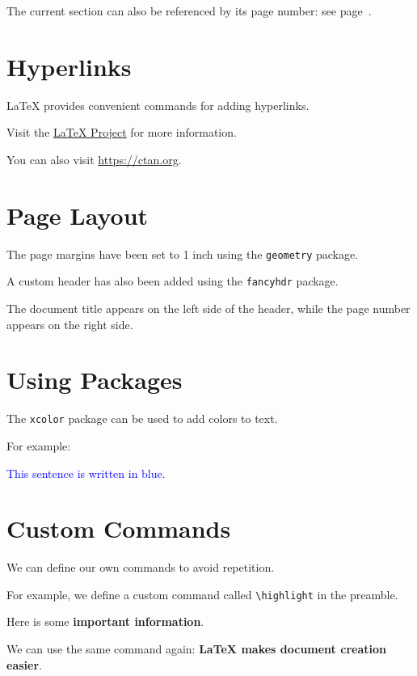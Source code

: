 \documentclass{article}
\newcommand{\highlight}[1]{\textbf{#1}}
\begin{document}
The current section can also be referenced by its page number:
see page~\pageref{sec:references}.


\section{Hyperlinks}

LaTeX provides convenient commands for adding hyperlinks.

Visit the
\href{https://www.latex-project.org}{LaTeX Project}
for more information.

You can also visit \url{https://ctan.org}.


\section{Page Layout}

The page margins have been set to 1 inch using the
\texttt{geometry} package.

A custom header has also been added using the
\texttt{fancyhdr} package.

The document title appears on the left side of the header,
while the page number appears on the right side.


\section{Using Packages}

The \texttt{xcolor} package can be used to add colors to text.

For example:

\textcolor{blue}{This sentence is written in blue.}


\section{Custom Commands}

We can define our own commands to avoid repetition.

For example, we define a custom command called
\texttt{\textbackslash highlight} in the preamble.

Here is some \highlight{important information}.

We can use the same command again:
\highlight{LaTeX makes document creation easier}.
\end{document}
